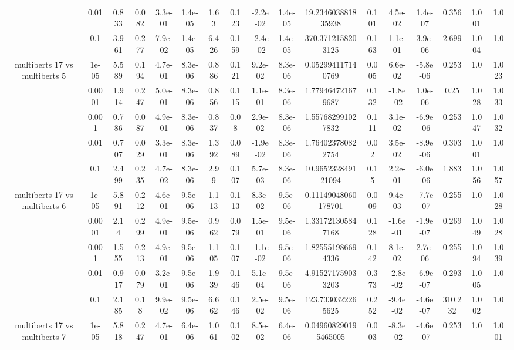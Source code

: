 \begin{tabular}{|c|c|c|c|c|c|c|c|c|c|c|c|c|c|c|c|c|}
 & 0.01 & 0.833 & 0.082 & 3.3e-01 & 1.4e-05 & 1.63 & 0.123 & -2.2e-02 & 1.4e-05 & 19.234603881835938 & 0.101 & 4.5e-02 & 1.4e-07 & 0.356 & 1.001 & 1.0 \\
 & 0.1 & 3.961 & 0.277 & 7.9e-02 & 1.4e-05 & 6.426 & 0.159 & -2.4e-02 & 1.4e-05 & 370.3712158203125 & 0.163 & 1.1e-01 & 3.9e-06 & 2.699 & 1.004 & 1.0 \\
\hline
\multirow{5}{*}{multiberts 17 vs multiberts 5} & 1e-05 & 5.589 & 0.194 & 4.7e-01 & 8.3e-06 & 0.886 & 0.121 & 9.2e-02 & 8.3e-06 & 0.052994117140769 & 0.005 & 6.6e-02 & -5.8e-06 & 0.253 & 1.0 & 1.023 \\
 & 0.0001 & 1.914 & 0.247 & 5.0e-01 & 8.3e-06 & 0.856 & 0.115 & 1.1e-01 & 8.3e-06 & 1.779464721679687 & 0.132 & -1.8e-02 & 1.0e-06 & 0.25 & 1.028 & 1.033 \\
 & 0.001 & 0.786 & 0.087 & 4.9e-01 & 8.3e-06 & 0.837 & 0.08 & 2.9e-02 & 8.3e-06 & 1.557682991027832 & 0.111 & 3.1e-02 & -6.9e-06 & 0.253 & 1.047 & 1.032 \\
 & 0.01 & 0.707 & 0.029 & 3.3e-01 & 8.3e-06 & 1.392 & 0.089 & -1.9e-02 & 8.3e-06 & 1.764023780822754 & 0.02 & 3.5e-02 & -8.9e-06 & 0.303 & 1.001 & 1.0 \\
 & 0.1 & 2.499 & 0.235 & 4.7e-02 & 8.3e-06 & 2.99 & 0.107 & 5.7e-03 & 8.3e-06 & 10.965232849121094 & 0.15 & 2.2e-01 & -6.0e-06 & 1.883 & 1.056 & 1.057 \\
\hline
\multirow{5}{*}{multiberts 17 vs multiberts 6} & 1e-05 & 5.891 & 0.212 & 4.6e-01 & 9.5e-06 & 1.113 & 0.113 & 8.3e-02 & 9.5e-06 & 0.11149048060178701 & 0.009 & 9.4e-03 & -7.7e-07 & 0.255 & 1.0 & 1.028 \\
 & 0.0001 & 2.14 & 0.299 & 4.9e-01 & 9.5e-06 & 0.962 & 0.079 & 1.5e-01 & 9.5e-06 & 1.331721305847168 & 0.128 & -1.6e-01 & -1.9e-07 & 0.269 & 1.049 & 1.028 \\
 & 0.001 & 1.555 & 0.213 & 4.9e-01 & 9.5e-06 & 1.105 & 0.107 & -1.1e-02 & 9.5e-06 & 1.825551986694336 & 0.142 & 8.1e-02 & 2.7e-06 & 0.255 & 1.094 & 1.039 \\
 & 0.01 & 0.917 & 0.079 & 3.2e-01 & 9.5e-06 & 1.939 & 0.146 & 5.1e-04 & 9.5e-06 & 4.915271759033203 & 0.373 & -2.8e-02 & -6.9e-07 & 0.293 & 1.005 & 1.0 \\
 & 0.1 & 2.185 & 0.18 & 9.9e-02 & 9.5e-06 & 6.662 & 0.146 & 2.5e-02 & 9.5e-06 & 123.7330322265625 & 0.252 & -9.4e-02 & -4.6e-07 & 310.232 & 1.002 & 1.0 \\
\hline
\multirow{5}{*}{multiberts 17 vs multiberts 7} & 1e-05 & 5.818 & 0.247 & 4.7e-01 & 6.4e-06 & 1.061 & 0.102 & 8.5e-02 & 6.4e-06 & 0.049608290195465005 & 0.003 & -8.3e-02 & -4.6e-07 & 0.253 & 1.0 & 1.001 \\

\end{tabular}
